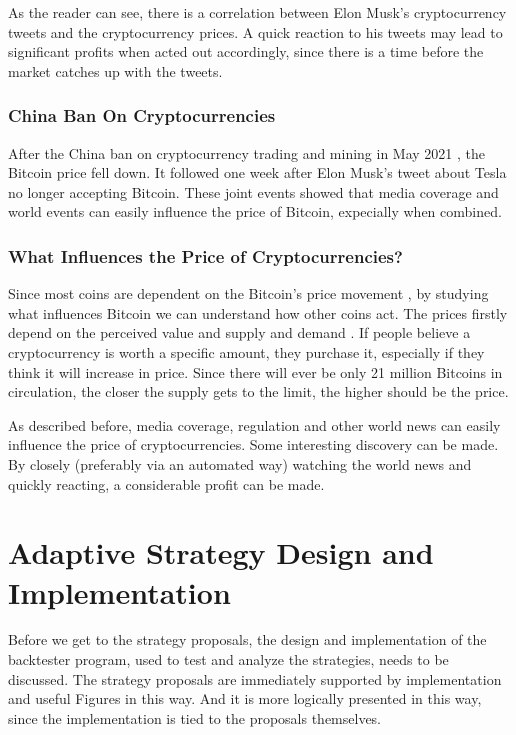 As the reader can see, there is a correlation between Elon Musk's cryptocurrency tweets and the cryptocurrency prices. A quick reaction to his tweets may lead to significant profits when acted out accordingly, since there is a time before the market catches up with the tweets.

\subsection*{China Ban On Cryptocurrencies}
After the China ban on cryptocurrency trading and mining in May 2021 \cite{china-ban-2}, the Bitcoin price fell down. It followed one week after Elon Musk's tweet about Tesla no longer accepting Bitcoin. These joint events showed that media coverage and world events can easily influence the price of Bitcoin, expecially when combined.

\subsection*{What Influences the Price of Cryptocurrencies?}
Since most coins are dependent on the Bitcoin's price movement \cite{investopedia:altcoins}, by studying what influences Bitcoin we can understand how other coins act. The prices firstly depend on the perceived value and supply and demand \cite{investopedia:bitcoin-price-history}. If people believe a cryptocurrency is worth a specific amount, they purchase it, especially if they think it will increase in price. Since there will ever be only 21 million Bitcoins in circulation, the closer the supply gets to the limit, the higher should be the price.

As described before, media coverage, regulation and other world news can easily influence the price of cryptocurrencies. Some interesting discovery can be made. By closely (preferably via an automated way) watching the world news and quickly reacting, a considerable profit can be made.

\chapter{Adaptive Strategy Design and Implementation}
\label{chapter-implementation}

Before we get to the strategy proposals, the design and implementation of the backtester program, used to test and analyze the strategies, needs to be discussed. The strategy proposals are immediately supported by implementation and useful Figures in this way. And it is more logically presented in this way, since the implementation is tied to the proposals themselves.

